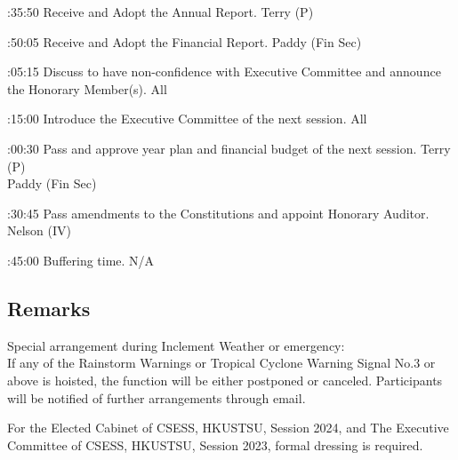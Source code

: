 \bTR{}:35:50
\eTD\bTD Receive and Adopt the Annual Report.
\eTD\bTD Terry (P)
\eTD\eTR

\bTR{}:50:05
\eTD\bTD Receive and Adopt the Financial Report.
\eTD\bTD Paddy (Fin Sec)
\eTD\eTR

\bTR{}:05:15
\eTD\bTD Discuss to have non-confidence with Executive Committee and announce the Honorary Member(s).
\eTD\bTD All
\eTD\eTR

\bTR{}:15:00
\eTD\bTD Introduce the Executive Committee of the next session.
\eTD\bTD All
\eTD\eTR

\bTR{}:00:30
\eTD\bTD Pass and approve year plan and financial budget of the next session.
\eTD\bTD Terry (P) \\ Paddy (Fin Sec)
\eTD\eTR

\bTR{}:30:45
\eTD\bTD Pass amendments to the Constitutions and appoint Honorary Auditor.
\eTD\bTD Nelson (IV)
\eTD\eTR

\bTR{}:45:00
\eTD\bTD Buffering time.
\eTD\bTD N/A
\eTD\eTR

\eTABLEbody
\eTABLE

\subsection{Remarks}
\startitemize
\item Special arrangement during Inclement Weather or emergency: \\
If any of the Rainstorm Warnings or Tropical Cyclone Warning Signal No.3 or above is hoisted, the function will be either postponed or canceled. Participants will be notified of further arrangements through email.
\item For the Elected Cabinet of CSESS, HKUSTSU, Session 2024, and The Executive Committee of CSESS, HKUSTSU, Session 2023, formal dressing is required.
\stopitemize

\stopsection
\pagebreak
